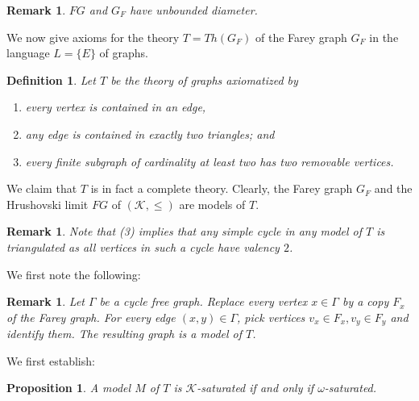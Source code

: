 \documentclass[10pt,a4paper]{amsart}
\newcommand{\G}{\Gamma}
\newcommand{\K}{\mathcal{K}}
\newtheorem{definition}[defi]{Definition}
\newtheorem{proposition}[defi]{Proposition}
\newtheorem{remark}[defi]{Remark}
\begin{document}
\begin{remark}
$FG$ and $G_F$ have unbounded diameter.
\end{remark}

We now give axioms for the theory $T=Th(G_F)$ of the Farey graph $G_F$ in the language $L = \{ E \} $ of graphs.

\begin{definition}
    Let $T$ be the theory of graphs axiomatized by 
\begin{enumerate}
   \item every vertex is contained in an edge,
    \item any edge is contained in exactly two triangles; and
    \item every finite subgraph of cardinality at least two has two removable vertices.
\end{enumerate}
\end{definition}
We claim that $T$ is in fact a complete theory.
Clearly, the Farey graph $G_F$ and  the Hrushovski limit $FG$ of $(\K,\leq)$ are models of $T$. 

\begin{remark}\label{rem:triangulated}
Note that (3) implies that any simple cycle in any model of $T$ is triangulated as all vertices in such a cycle have valency $2$.
\end{remark}

We first note the following:

\begin{remark}\label{rem: tree of Fareys}
Let $\G$ be a cycle free graph. Replace every vertex $x\in\G$ by a copy $F_x$ of the Farey graph. For every edge $(x,y)\in \G$, pick vertices $v_x\in F_x, v_y\in F_y$ and identify them. The resulting graph is a model of $T$. 
\end{remark}


We first establish:
\begin{proposition}\label{prop:K-saturated}
    A model  $M$ of $T$ is $\K$-saturated if and only if $\omega$-saturated.
\end{proposition}
\end{document}
